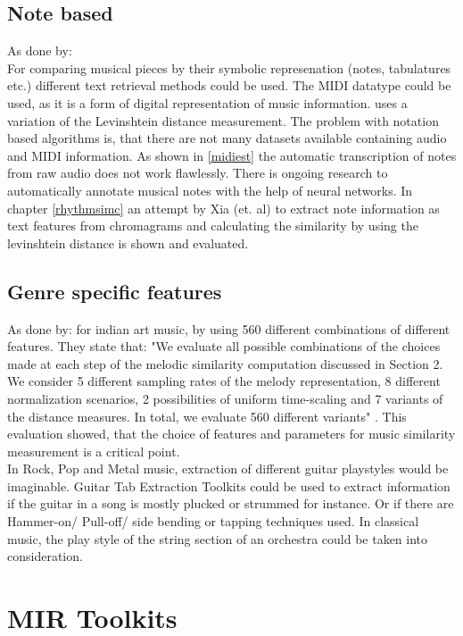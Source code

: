 \subsection{Note based}

As done by: \cite{midi1}\\
For comparing musical pieces by their symbolic represenation (notes, tabulatures etc.) different text retrieval methods could be used. The MIDI datatype could be used, as it is a form of digital representation of music information. 
\cite{midi1} uses a variation of the Levinshtein distance measurement. 
The problem with notation based algorithms is, that there are not many datasets available containing audio and MIDI information.
As shown in \ref{midiest} the automatic transcription of notes from raw audio does not work flawlessly. 
There is ongoing research to automatically annotate musical notes with the help of neural networks.\cite{crepe1}
In chapter \ref{rhythmsimc} an attempt by Xia (et. al) \cite{chroma4} to extract note information as text features from chromagrams and calculating the similarity by using the levinshtein distance is shown and evaluated.

\subsection{Genre specific features}

As done by: \cite{mussim1} for indian art music, by using 560 different combinations of different features. They state that: "We evaluate all possible combinations of the choices made at each step of the melodic similarity computation discussed in Section 2.  We consider 5 different sampling rates of the melody representation, 8 different normalization scenarios, 2 possibilities of uniform time-scaling and 7 variants of the distance measures.  In total, we evaluate 560 different variants" \cite[p. 3]{mussim1}. This evaluation showed, that the choice of features and parameters for music similarity measurement is a critical point.\\
In Rock, Pop and Metal music, extraction of different guitar playstyles would be imaginable. Guitar Tab Extraction \cite{guitext1} Toolkits could be used to extract information if the guitar in a song is mostly plucked or strummed for instance. Or if there are Hammer-on/ Pull-off/ side bending or tapping techniques used.
In classical music, the play style of the string section of an orchestra could be taken into consideration. 

\section{MIR Toolkits}\label{mirtoolkit}
